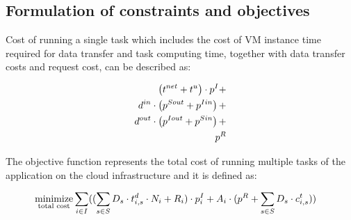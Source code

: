 {\subsection{Formulation of constraints and objectives}

  Cost of running a single task which includes the cost of VM instance time required for data transfer and task computing time, together with data transfer costs and request cost, can be described as: 

  \begin{align*}
      \left(t^{net} + t^u\right) \cdot p^I + \\
      d^{in} \cdot \left(p^{Sout} + p^{Iin}\right) + \\
      d^{out} \cdot \left(p^{Iout} + p^{Sin}\right) + \\
      p^{R}
  \end{align*}

  The objective function represents the total cost of running multiple tasks of the application on the cloud infrastructure and it is defined as:

  \begin{align}    
      \underset{\text{total cost}}{\text{minimize}} \sum \limits_{i \in I}  ( & 
                   (\sum\limits_{s \in S} D_s\cdot t^d_{i,s}\cdot N_i + R_i) \cdot p^I_i  
                    + A_i\cdot(p^{R} + \sum\limits_{s \in S} D_s \cdot c^t_{i,s})
                 )
  \end{align}
  
}
